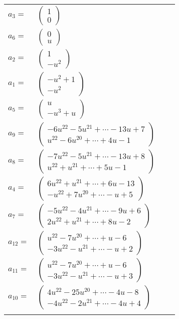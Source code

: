 \documentclass[1p]{elsarticle_modified}
\theoremstyle{definition}
\begin{document}
\begin{tabular}{m{7pt} m{180pt} m{7pt} m{180pt} }
\flushright $a_{3}=$&$\begin{pmatrix}1\\0\end{pmatrix}$ \\
\flushright $a_{6}=$&$\begin{pmatrix}0\\u\end{pmatrix}$ \\
\flushright $a_{2}=$&$\begin{pmatrix}1\\- u^2\end{pmatrix}$ \\
\flushright $a_{1}=$&$\begin{pmatrix}- u^2+1\\- u^2\end{pmatrix}$ \\
\flushright $a_{5}=$&$\begin{pmatrix}u\\- u^3+u\end{pmatrix}$ \\
\flushright $a_{9}=$&$\begin{pmatrix}-6 u^{22}-5 u^{21}+\cdots-13 u+7\\u^{22}-6 u^{20}+\cdots+4 u-1\end{pmatrix}$ \\
\flushright $a_{8}=$&$\begin{pmatrix}-7 u^{22}-5 u^{21}+\cdots-13 u+8\\u^{22}+u^{21}+\cdots+5 u-1\end{pmatrix}$ \\
\flushright $a_{4}=$&$\begin{pmatrix}6 u^{22}+u^{21}+\cdots+6 u-13\\- u^{22}+7 u^{20}+\cdots- u+5\end{pmatrix}$ \\
\flushright $a_{7}=$&$\begin{pmatrix}-5 u^{22}-4 u^{21}+\cdots-9 u+6\\2 u^{22}+u^{21}+\cdots+8 u-2\end{pmatrix}$ \\
\flushright $a_{12}=$&$\begin{pmatrix}u^{22}-7 u^{20}+\cdots+u-6\\-3 u^{22}- u^{21}+\cdots- u+2\end{pmatrix}$ \\
\flushright $a_{11}=$&$\begin{pmatrix}u^{22}-7 u^{20}+\cdots+u-6\\-3 u^{22}- u^{21}+\cdots- u+3\end{pmatrix}$ \\
\flushright $a_{10}=$&$\begin{pmatrix}4 u^{22}-25 u^{20}+\cdots-4 u-8\\-4 u^{22}-2 u^{21}+\cdots-4 u+4\end{pmatrix}$\\&\end{tabular}
\end{document}
